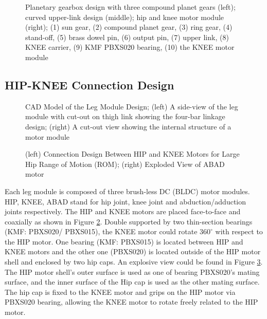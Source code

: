 \begin{figure}
	\centering
	\caption{Planetary gearbox design with three compound planet gears (left); curved upper-link design (middle); hip and knee motor module (right); (1) sun gear, (2) compound planet gear, (3) ring gear, (4) stand-off, (5) brass dowel pin, (6) output pin, (7) upper link, (8) KNEE carrier, (9) KMF PBXS020 bearing, (10) the KNEE motor module}
	\label{fig:gearbox}
\end{figure}



\subsection{HIP-KNEE Connection Design}
\label{sec:Design4ROM}

\begin{figure}
	\centering
	\caption{CAD Model of the Leg Module Design; (left) A side-view of the leg module with cut-out on thigh link showing the four-bar linkage design; (right) A cut-out view showing the internal structure of a motor module}
	\label{fig:LegDesign}
\end{figure}
\begin{figure}
	\centering
	\caption{(left) Connection Design Between HIP and KNEE Motors for Large Hip Range of Motion (ROM); (right) Exploded View of ABAD motor}
	\label{fig:KMFbearings}
\end{figure}

Each leg module is composed of three brush-less DC (BLDC) motor modules. HIP, KNEE, ABAD stand for hip joint, knee joint and abduction/adduction joints respectively. The HIP and KNEE motors are placed face-to-face and coaxially as shown in Figure \ref{fig:LegDesign}. Double supported by two thin-section bearings (KMF: PBXS020/ PBXS015), the KNEE motor could rotate $360^{\circ}$ with respect to the HIP motor. One bearing (KMF: PBXS015) is located between HIP and KNEE motors and the other one (PBXS020) is located outside of the HIP motor shell and enclosed by two hip caps. An explosive view could be found in Figure \ref{fig:KMFbearings}. The HIP motor shell's outer surface is used as one of bearing PBXS020's mating surface, and the inner surface of the Hip cap is used as the other mating surface. The hip cap is fixed to the KNEE motor and grips on the HIP motor via PBXS020 bearing, allowing the KNEE motor to rotate freely related to the HIP motor.

